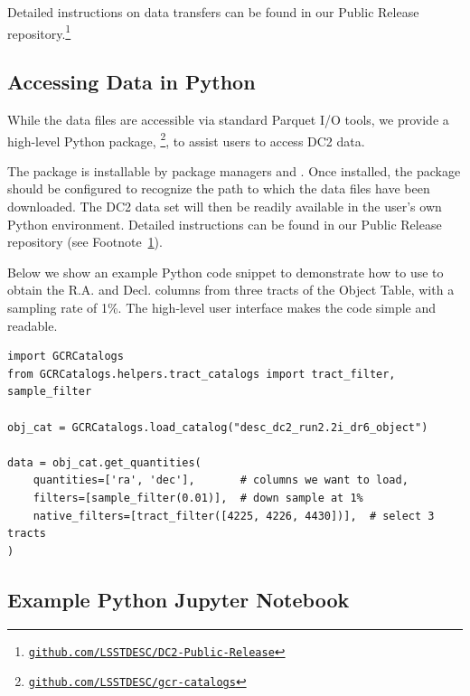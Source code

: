 \documentclass[modern]{descnote}
\newcommand*{\https}[1]{\href{https://#1}{\nolinkurl{#1}}}
\begin{document}
Detailed instructions on data transfers can be found in our Public Release repository.\footnote{\https{github.com/LSSTDESC/DC2-Public-Release}\label{fn:repo}}

\subsection{Accessing Data in Python}
\label{sec:gcr}

While the data files are accessible via standard Parquet I/O tools, we provide a high-level Python package, \footnote{\https{github.com/LSSTDESC/gcr-catalogs}}, to assist users to access DC2 data. 

The  package is installable by package managers  and .
Once installed, the package should be configured to recognize the path to which the data files have been downloaded. The DC2 data set will then be readily available in the user's own Python environment. 
Detailed instructions can be found in our Public Release repository (see Footnote~\ref{fn:repo}).

Below we show an example Python code snippet to demonstrate how to use  to obtain the R.A. and Decl. columns from three tracts of the Object Table, with a sampling rate of 1\%. The high-level user interface makes the code simple and readable. 

\begin{verbatim}
import GCRCatalogs
from GCRCatalogs.helpers.tract_catalogs import tract_filter, sample_filter

obj_cat = GCRCatalogs.load_catalog("desc_dc2_run2.2i_dr6_object")

data = obj_cat.get_quantities(
    quantities=['ra', 'dec'],       # columns we want to load, 
    filters=[sample_filter(0.01)],  # down sample at 1%
    native_filters=[tract_filter([4225, 4226, 4430])],  # select 3 tracts
)
\end{verbatim}

\subsection{Example Python Jupyter Notebook}
\label{sec:notebooks}
\end{document}
